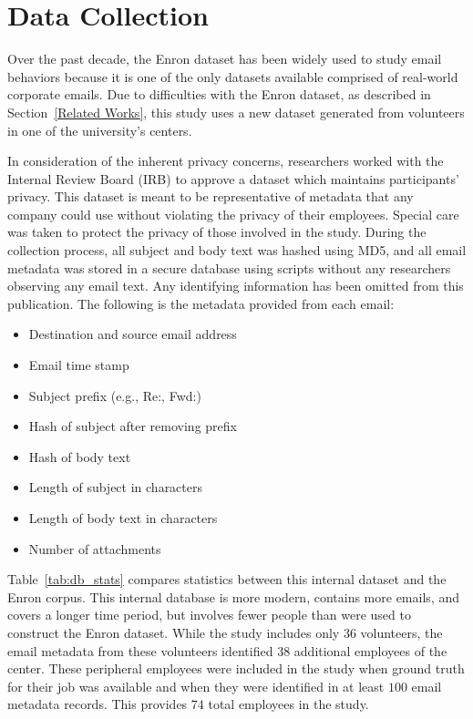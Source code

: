 \documentclass[10pt,twocolumn,conference]{IEEEtran}
\begin{document}
\section{Data Collection} \label{Data Collection}

Over the past decade, the Enron dataset has been widely used to study email behaviors because it is one of the only datasets available comprised of real-world corporate emails.
Due to difficulties with the Enron dataset, as described in Section~\ref{Related Works}, this study uses a new dataset generated from volunteers in one of the university's centers.

In consideration of the inherent privacy concerns, researchers worked with the Internal Review Board (IRB) to approve a dataset which maintains participants' privacy.
This dataset is meant to be representative of metadata that any company could use without violating the privacy of their employees.
Special care was taken to protect the privacy of those involved in the study.
During the collection process, all subject and body text was hashed using MD5, and all email metadata was stored in a secure database using scripts without any researchers observing any email text.
Any identifying information has been omitted from this publication.
The following is the metadata provided from each email:
\begin{itemize}
\item Destination and source email address
\item Email time stamp
\item Subject prefix (e.g., Re:, Fwd:)
\item Hash of subject after removing prefix
\item Hash of body text
\item Length of subject in characters
\item Length of body text in characters
\item Number of attachments
\end{itemize}

Table~\ref{tab:db_stats} compares statistics between this internal dataset and the Enron corpus.
This internal database is more modern, contains more emails, and covers a longer time period, but involves fewer people than were used to construct the Enron dataset.
While the study includes only 36 volunteers, the email metadata from these volunteers identified $38$ additional employees of the center.
These peripheral employees were included in the study when ground truth for their job was available and when they were identified in at least $100$ email metadata records.
This provides $74$ total employees in the study.
\end{document}
